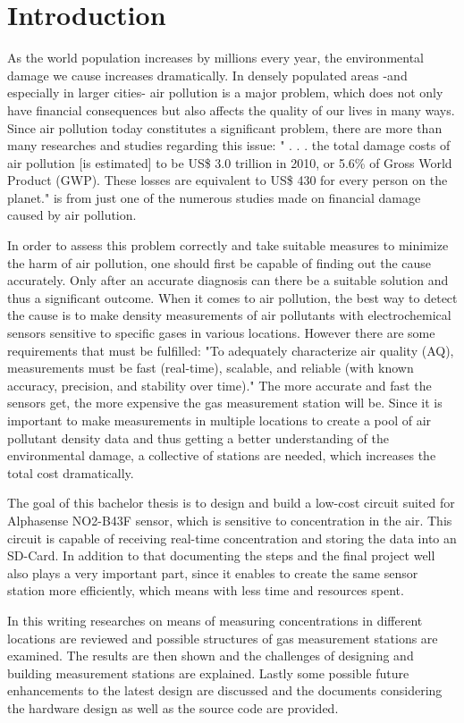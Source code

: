 \chapter{Introduction}
\label{sec:introduction}


As the world population increases by millions every year, the environmental damage we cause increases dramatically. In densely populated areas -and especially in larger cities- air pollution is a major problem, which does not only have financial consequences but also affects the quality of our lives in many ways. Since air pollution today constitutes a significant problem, there are more than many researches and studies regarding this issue: " . . . the total damage costs of air pollution [is estimated] to be US\$ 3.0 trillion in 2010, or 5.6\% of Gross World Product (GWP). These losses are equivalent to US\$ 430 for every person on the planet."\cite{Hutton2011} is from just one of the numerous studies made on financial damage caused by air pollution.\par
In order to assess this problem correctly and take suitable measures to minimize the harm of air pollution, one should first be capable of finding out the cause accurately. Only after an accurate diagnosis can there be a suitable solution and thus a significant outcome. When it comes to air pollution, the best way to detect the cause is to make density measurements of air pollutants with electrochemical sensors sensitive to specific gases in various locations. However there are some requirements that must be fulfilled: "To adequately characterize air quality (AQ), measurements must be fast (real-time), scalable, and reliable (with known accuracy, precision, and stability over time)."\cite{Cross2017} The more accurate and fast the sensors get, the more expensive the gas measurement station will be. Since it is important to make measurements in multiple locations to create a pool of air pollutant density data and thus getting a better understanding of the environmental damage, a collective of stations are needed, which increases the total cost dramatically.\par
The goal of this bachelor thesis is to design and build a low-cost circuit suited for Alphasense NO2-B43F sensor, which is sensitive to  concentration in the air. This circuit is capable of receiving real-time  concentration and storing the data into an SD-Card. In addition to that documenting the steps and the final project well also plays a very important part, since it enables to create the same sensor station more efficiently, which means with less time and resources spent. \par 
In this writing researches on means of measuring  concentrations in different locations are reviewed and possible structures of gas measurement stations are examined. The results are then shown and the challenges of designing and building  measurement stations are explained. Lastly some possible future enhancements to the latest design are discussed and the documents considering the hardware design as well as the source code are provided. 
